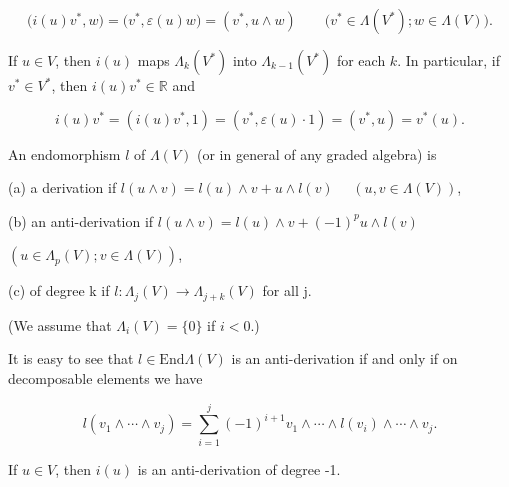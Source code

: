 \begin{equation}
\tag{2}\label{eq:2.11:2}
\big(i(u)v^{*},w\big)=\big(v^{*},\varepsilon(u)w\big)=(v^{*},u\land w)\qquad\big(v^{*}\in\Lambda(V^{*});w\in\Lambda(V)\big).
\end{equation}

If $u \in V$, then $i(u)$ maps $\Lambda_k(V^*)$ into $\Lambda_{k-1}(V^*)$ for each $k$. In particular, if $v^* \in V^*$, then $i(u)v^* \in \mathbb{R}$ and

\[
i(u)v^{*}=\left(i(u)v^{*},1\right)=\left(v^{*},\varepsilon(u)\cdot1\right)=(v^{*},u)=v^{*}(u).
\]

An endomorphism $l$ of $\Lambda(V)$ (or in general of any graded algebra) is

(a) a derivation if $l(u \land v) = l(u) \land v + u \land l(v)$ $\quad (u, v \in \Lambda(V))$,

(b) an anti-derivation if $l(u \land v) = l(u) \land v + (-1)^p u \land l(v)$

$(u \in \Lambda_p(V); v \in \Lambda(V))$,

(c) of degree k if  $ l\colon \Lambda_{j}(V) \to \Lambda_{j+k}(V) $ for all j.

(We assume that  $ \Lambda_{i}(V) = \{0\} $ if  $ i < 0 $.)

It is easy to see that  $ l \in \text{End} \Lambda(V) $ is an anti-derivation if and only if on decomposable elements we have

\begin{equation}
\tag{3}\label{eq:2.11:3}
l(v_{1}\wedge\cdots\wedge v_{j})=\sum_{i=1}^{j}(-1)^{i+1}v_{1}\wedge\cdots\wedge l(v_{i})\wedge\cdots\wedge v_{j}.
\end{equation}


\begin{proposition}\label{thm:2.12}
If $u \in V$, then $i(u)$ is an anti-derivation of degree -1. 

\end{proposition}

